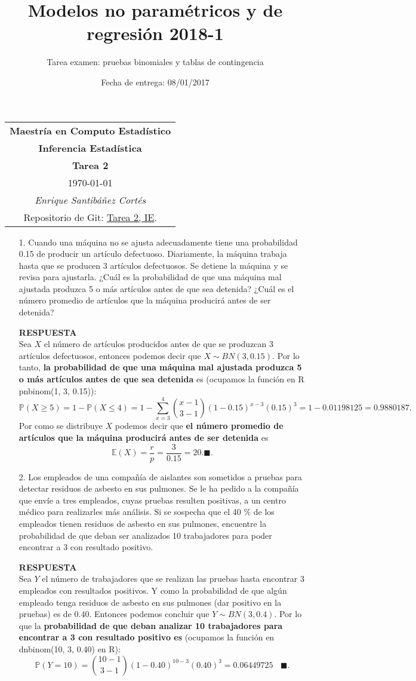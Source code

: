 \documentclass[11pt,letterpaper]{article}
\title{Modelos no paramétricos y de regresión 2018-1}
\author{Tarea examen: pruebas binomiales y tablas de contingencia}
\date{Fecha de entrega: 08/01/2017}
\newcommand{\mP}{\mathbb{P}}
\newcommand{\mE}{\mathbb{E}}
\newcommand{\res}{\textbf{RESPUESTA}\\}
\newcommand{\finf}{\blacksquare.}
\begin{document}
\begin{table}[ht]
\centering
\begin{tabular}{c}
\textbf{Maestría en Computo Estadístico}\\
\textbf{Inferencia Estadística} \\
\textbf{Tarea 2}\\
\today \\
\emph{Enrique Santibáñez Cortés}\\
Repositorio de Git: \href{https://github.com/Enriquesec/Inferencia_Estad-stica/tree/master/Tareas/Tarea_2}{Tarea 2, IE}.
\end{tabular}
\end{table}

\begin{itemize}
\item[1.] Cuando una máquina no se ajusta adecuadamente tiene una probabilidad 0.15 de producir un artículo defectuoso. Diariamente, la máquina trabaja hasta que se producen 3 artículos defectuosos. Se detiene la máquina y se revisa para ajustarla. ¿Cuál es la probabilidad de que una máquina mal ajustada produzca 5 o más artículos antes de que sea detenida? ¿Cuál es el número promedio de artículos que la máquina producirá antes de ser detenida?

\res
Sea $X$ el número de artículos producidos antes de que se produzcan 3 artículos defectuosos, entonces podemos decir que $X\sim BN(3,0.15).$ Por lo tanto, \textbf{la probabilidad de que una máquina mal ajustada produzca 5 o más artículos antes de que sea detenida} es (ocupamos la función en R pnbinom(1, 3, 0.15)):
$$\mP(X\geq 5) =1-\mP(X\leq 4)=1-\sum_{x=3}^4{x-1 \choose 3-1}(1-0.15)^{x-3}(0.15)^3= 1-0.01198125=0.9880187.$$
Por como se distribuye $X$ podemos decir que \textbf{el número promedio de artículos que la máquina producirá antes de ser detenida} es
$$\mE(X)=\frac{r}{p}=\frac{3}{0.15}=20. \finf$$

\item[2.] Los empleados de una compañía de aislantes son sometidos a pruebas para detectar residuos de asbesto en sus pulmones. Se le ha pedido a la compañía que envíe a tres empleados, cuyas pruebas resulten positivas, a un centro médico para realizarles más análisis. Si se sospecha que el 40 \% de los empleados tienen residuos de asbesto en sus pulmones, encuentre la probabilidad de que deban ser analizados 10 trabajadores para poder encontrar a 3 con resultado positivo.

\res
Sea $Y$ el número de trabajadores que se realizan las pruebas hasta encontrar 3 empleados con resultados positivos. Y como la probabilidad de que algún empleado tenga residuos de asbesto en sus pulmones (dar positivo en la pruebas) es de $0.40$. Entonces podemos concluir que $Y\sim BN(3,0.4).$ Por lo que la \textbf{probabilidad de que deban analizar 10 trabajadores para encontrar a 3 con resultado positivo es} (ocupamos la función en dnbinom(10, 3, 0.40) en R):
$$\mP(Y=10) = {10-1 \choose 3-1}(1-0.40)^{10-3}(0.40)^3= 0.06449725\ \ \ \ \finf$$


\end{itemize}
\end{document}
